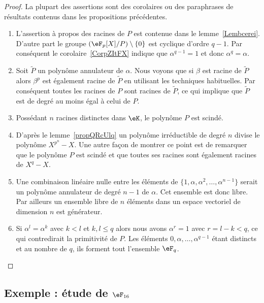 \begin{proof}
	La plupart des assertions sont des corolaires ou des paraphrases de résultats contenus dans les propositions précédentes.
	\begin{enumerate}
		\item
		      L'assertion à propos des racines de \( P\) est contenue dans le lemme~\ref{Lembcerei}. D'autre part le groupe \( (\eF_p[X]/P)\setminus\{ 0 \}\) est cyclique d'ordre \( q-1\). Par conséquent le corolaire~\ref{CorpZItFX} indique que \( \alpha^{q-1}=1\) et donc \( \alpha^q=\alpha\).
		\item
		      Soit \( \tilde P\) un polynôme annulateur de \( \alpha\). Nous voyons que si \( \beta\) est racine de \( \tilde P\) alors \( \beta^p\) est également racine de \( \tilde P\) en utilisant les techniques habituelles. Par conséquent toutes les racines de \( P\) sont racines de \( \tilde P\), ce qui implique que \( \tilde P\) est de degré au moins égal à celui de \( P\).
		\item
		      Possédant \( n\) racines distinctes dans \( \eK\), le polynôme \( P\) est scindé.
		\item
		      D'après le lemme~\ref{propQRcUlq} un polynôme irréductible de degré \( n\) divise le polynôme \( X^{p^n}-X\). Une autre façon de montrer ce point est de remarquer que le polynôme \( P\) est scindé et que toutes ses racines sont également racines de \( X^q-X\).
		\item
		      Une combinaison linéaire nulle entre les éléments de \( \{ 1,\alpha,\alpha^2,\ldots, \alpha^{n-1} \}\) serait un polynôme annulateur de degré \( n-1\) de \( \alpha\). Cet ensemble est donc libre. Par ailleurs un ensemble libre de \( n\) éléments dans un espace vectoriel de dimension \( n\) est générateur.
		\item
		      Si \( \alpha^l=\alpha^k\) avec \( k<l\) et \( k,l\leq q\) alors nous avons \( \alpha^r=1\) avec \( r=l-k<q\), ce qui contredirait la primitivité de \( P\). Les éléments \( 0,\alpha,\ldots, \alpha^{q-1}\) étant distincts et au nombre de \( q\), ils forment tout l'ensemble \( \eF_q\).
	\end{enumerate}
\end{proof}

\subsection{Exemple : étude de \texorpdfstring{\( \eF_{16}\)}{F16}}


